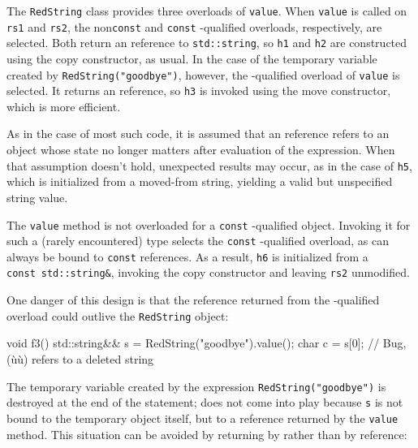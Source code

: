 \noindent The \lstinline!RedString! class provides three 
overloads of \lstinline!value!. When \lstinline!value! is called on
\lstinline!rs1! and \lstinline!rs2!, the non\lstinline!const! and \lstinline!const!
-qualified overloads, respectively, are selected. Both
return an  reference to \lstinline!std::string!, so
\lstinline!h1! and \lstinline!h2! are constructed using the copy constructor,
as usual. In the case of the temporary variable created by
\lstinline!RedString("goodbye")!, however, the -qualified
overload of \lstinline!value! is selected. It returns an 
reference, so \lstinline!h3! is invoked using the move constructor, which
is more efficient.

As in the case of most such code, it is assumed that an 
reference refers to an object whose state no longer matters after
evaluation of the expression. When that assumption doesn't hold,
unexpected results may occur, as in the case of \lstinline!h5!, which is
initialized from a moved-from string, yielding a valid but unspecified
string value.

The \lstinline!value! method is not overloaded for a \lstinline!const!
-qualified object. Invoking it for such a (rarely
encountered) type selects the \lstinline!const! -qualified
overload, as  can always be bound to \lstinline!const!
 references. As a result, \lstinline!h6! is initialized from a
\lstinline!const!~\lstinline!std::string&!, invoking the copy constructor and
leaving \lstinline!rs2! unmodified.

One danger of this design is that the reference returned from the
-qualified overload could outlive the \lstinline!RedString!
object:

\begin{emcppslisting}
void f3()
{
    std::string&& s = RedString("goodbye").value();
    char c = s[0];  // Bug, (ù{}ù) refers to a deleted string
}
\end{emcppslisting}
    

\noindent The temporary variable created by the expression
\lstinline!RedString("goodbye")! is destroyed at the end of the statement;
 does not come into play because \lstinline!s!
is not bound to the temporary object itself, but to a reference returned
by the \lstinline!value! method. This situation can be avoided by returning
by  rather than by reference:

